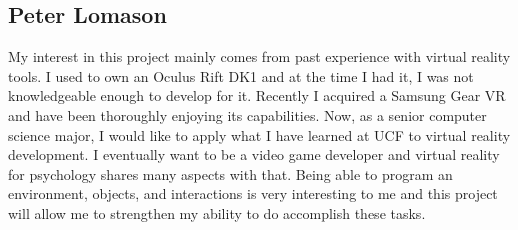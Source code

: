 \documentclass[a4paper,10pt]{article}
\begin{document}
	\subsection{Peter Lomason}
	My interest in this project mainly comes from past experience with virtual reality tools. I used to own an Oculus Rift DK1 and at the time I had it, 
	I was not knowledgeable enough to develop for it. Recently I acquired a Samsung Gear VR and have been thoroughly enjoying its capabilities. Now, as a senior computer science major, I would like to apply what I have learned at UCF to virtual reality development. I eventually want to be a video game developer and virtual reality for psychology shares many aspects with that. Being able to program an environment, objects, and interactions is very interesting to me and this project will allow me to strengthen my ability to do accomplish these tasks.
	
\pagebreak




\end{document}
